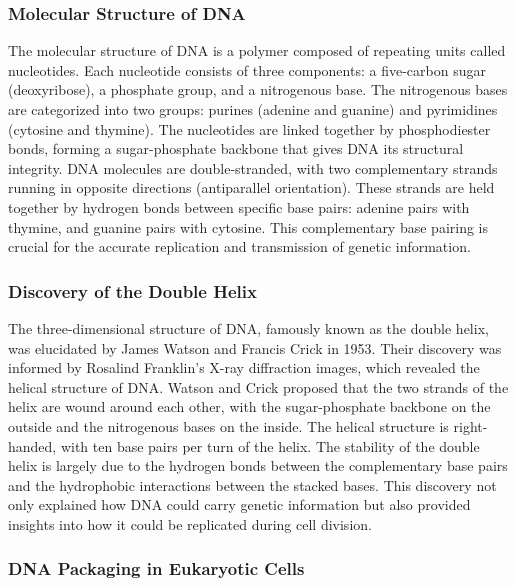 \subsubsection{\textbf{Molecular Structure of DNA}}

The molecular structure of DNA is a polymer composed of repeating units called nucleotides. Each nucleotide consists of three components: a five-carbon sugar (deoxyribose), a phosphate group, and a nitrogenous base. The nitrogenous bases are categorized into two groups: purines (adenine and guanine) and pyrimidines (cytosine and thymine). The nucleotides are linked together by phosphodiester bonds, forming a sugar-phosphate backbone that gives DNA its structural integrity. DNA molecules are double-stranded, with two complementary strands running in opposite directions (antiparallel orientation). These strands are held together by hydrogen bonds between specific base pairs: adenine pairs with thymine, and guanine pairs with cytosine. This complementary base pairing is crucial for the accurate replication and transmission of genetic information. %

\subsubsection{\textbf{Discovery of the Double Helix}}

The three-dimensional structure of DNA, famously known as the double helix, was elucidated by James Watson and Francis Crick in 1953. Their discovery was informed by Rosalind Franklin’s X-ray diffraction images, which revealed the helical structure of DNA. Watson and Crick proposed that the two strands of the helix are wound around each other, with the sugar-phosphate backbone on the outside and the nitrogenous bases on the inside. The helical structure is right-handed, with ten base pairs per turn of the helix. The stability of the double helix is largely due to the hydrogen bonds between the complementary base pairs and the hydrophobic interactions between the stacked bases. This discovery not only explained how DNA could carry genetic information but also provided insights into how it could be replicated during cell division. %

\subsubsection{\textbf{DNA Packaging in Eukaryotic Cells}}

